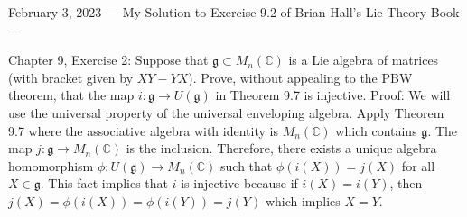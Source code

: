 February 3, 2023
---
My Solution to Exercise 9.2 of Brian Hall's Lie Theory Book
---

Chapter 9, Exercise 2: Suppose that $\mathfrak{g} \subset M_n(\mathbb{C})$ is a Lie algebra of matrices (with bracket given by $XY-YX$). Prove, without appealing to the PBW theorem, that the map $i:\mathfrak{g}\to U(\mathfrak{g})$ in Theorem 9.7 is injective.
Proof: We will use the universal property of the universal enveloping algebra. Apply Theorem 9.7 where the associative algebra with identity is $M_n(\mathbb{C})$ which contains $\mathfrak{g}$. The map $j:\mathfrak{g}\to M_n(\mathbb{C})$ is the inclusion. Therefore, there exists a unique algebra homomorphism $\phi: U(\mathfrak{g}) \to M_n(\mathbb{C})$ such that $\phi(i(X)) = j(X)$ for all $X\in \mathfrak{g}$. This fact implies that $i$ is injective because if $i(X) = i(Y)$, then $j(X) = \phi(i(X)) = \phi(i(Y)) = j(Y)$ which implies $X=Y$.